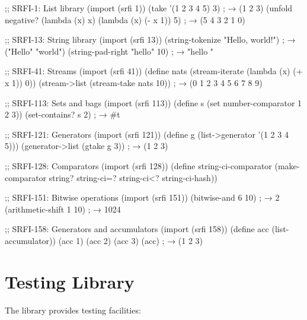 \begin{example}
\begin{lambdustcode}
;; SRFI-1: List library
(import (srfi 1))
(take '(1 2 3 4 5) 3)                   ; → (1 2 3)
(unfold negative? (lambda (x) x) (lambda (x) (- x 1)) 5)
; → (5 4 3 2 1 0)

;; SRFI-13: String library  
(import (srfi 13))
(string-tokenize "Hello, world!")       ; → ("Hello" "world")
(string-pad-right "hello" 10)           ; → "hello     "

;; SRFI-41: Streams
(import (srfi 41))
(define nats (stream-iterate (lambda (x) (+ x 1)) 0))
(stream->list (stream-take nats 10))     ; → (0 1 2 3 4 5 6 7 8 9)

;; SRFI-113: Sets and bags
(import (srfi 113))
(define s (set number-comparator 1 2 3))
(set-contains? s 2)                      ; → #t

;; SRFI-121: Generators
(import (srfi 121))
(define g (list->generator '(1 2 3 4 5)))
(generator->list (gtake g 3))            ; → (1 2 3)

;; SRFI-128: Comparators  
(import (srfi 128))
(define string-ci-comparator
  (make-comparator string? string-ci=? string-ci<? string-ci-hash))

;; SRFI-151: Bitwise operations
(import (srfi 151))
(bitwise-and 6 10)                       ; → 2
(arithmetic-shift 1 10)                  ; → 1024

;; SRFI-158: Generators and accumulators
(import (srfi 158))
(define acc (list-accumulator))
(acc 1) (acc 2) (acc 3)
(acc)                                    ; → (1 2 3)
\end{lambdustcode}
\end{example}

\section{Testing Library}
\label{sec:testing-library}


The  library provides testing facilities:

